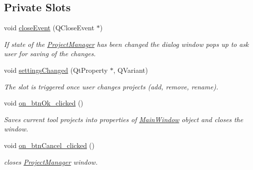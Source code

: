 \subsection*{Private Slots}
\begin{DoxyCompactItemize}
\item 
void \hyperlink{classProjectManager_ad03d75a04852c5f4d85dd5ede30c2a71}{close\-Event} (Q\-Close\-Event $\ast$)
\begin{DoxyCompactList}\small\item\em If state of the \hyperlink{classProjectManager}{Project\-Manager} has been changed the dialog window pops up to ask user for saving of the changes. \end{DoxyCompactList}\item 
void \hyperlink{classProjectManager_ad8697c2b5edaa3aeda168de093139254}{settings\-Changed} (Qt\-Property $\ast$, Q\-Variant)
\begin{DoxyCompactList}\small\item\em The slot is triggered once user changes projects (add, remove, rename). \end{DoxyCompactList}\item 
void \hyperlink{classProjectManager_acbe13c3a4fd77ebbc0437d3c9ecfe78e}{on\-\_\-btn\-Ok\-\_\-clicked} ()
\begin{DoxyCompactList}\small\item\em Saves current tool projects into properties of \hyperlink{classMainWindow}{Main\-Window} object and closes the window. \end{DoxyCompactList}\item 
void \hyperlink{classProjectManager_a808da17a51773b55f6330f7c11cbdbef}{on\-\_\-btn\-Cancel\-\_\-clicked} ()
\begin{DoxyCompactList}\small\item\em closes \hyperlink{classProjectManager}{Project\-Manager} window. \end{DoxyCompactList}\end{DoxyCompactItemize}
